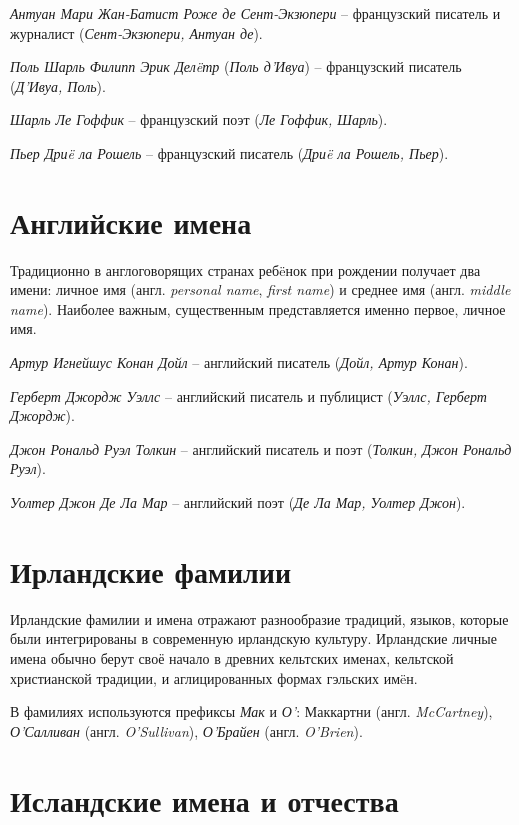 \emph{Антуан Мари Жан-Батист Роже де  Сент-Экзюпери} -- французский писатель и журналист (\emph{Сент-Экзюпери, Антуан де}).

\emph{Поль Шарль Филипп Эрик Дел\"eтр} (\emph{Поль д’Ивуа}) – французский писатель (\emph{Д’Ивуа, Поль}).

\emph{Шарль Ле Гоффик} -- французский поэт (\emph{Ле Гоффик, Шарль}).

\emph{Пьер Дри\"e ла Рошель} -- французский писатель (\emph{Дри\"e ла Рошель, Пьер}).

\section{Английские имена}

Традиционно в англоговорящих странах реб\"eнок при рождении получает два имени: личное имя (англ. \emph{personal name}, \emph{first name}) и среднее имя (англ. \emph{middle name}). Наиболее важным, существенным представляется именно первое, личное имя.

\emph{Артур Игнейшус Конан Дойл} -- английский писатель (\emph{Дойл, Артур Конан}).

\emph{Герберт Джордж Уэллс} -- английский писатель и публицист (\emph{Уэллс, Герберт Джордж}).

\emph{Джон Рональд Руэл Толкин} -- английский писатель и поэт (\emph{Толкин, Джон Рональд Руэл}).

\emph{Уолтер Джон Де Ла Мар} -- английский поэт (\emph{Де Ла Мар, Уолтер Джон}).

\section{Ирландские фамилии}

Ирландские фамилии и имена отражают разнообразие традиций, языков, которые были интегрированы в современную ирландскую культуру. Ирландские личные имена обычно берут своё начало в древних кельтских именах, кельтской христианской традиции, и аглицированных формах гэльских им\"eн.

В фамилиях используются префиксы \emph{Мак} и \emph{О'}: Маккартни (англ. \emph{McCartney}), \emph{О'Салливан} (англ. \emph{O'Sullivan}), \emph{О'Брайен} (англ. \emph{O'Brien}).

\section{Исландские имена и отчества}

